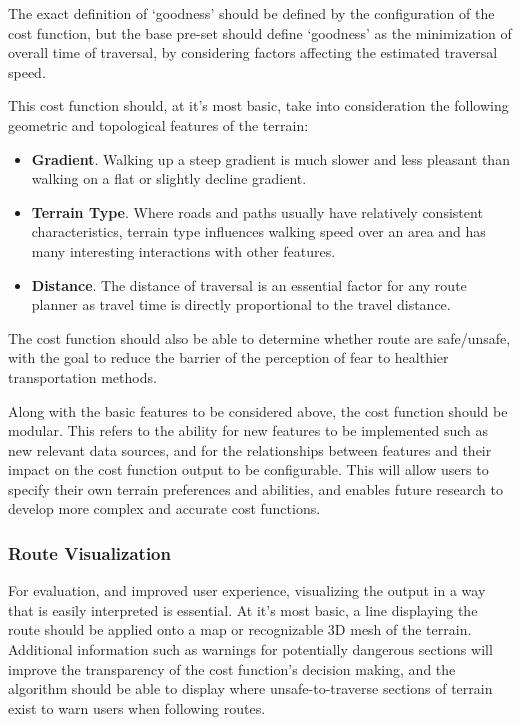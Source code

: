 \documentclass[12pt]{article}
\begin{document}
The exact definition of `goodness' should be defined by the configuration of the cost function, but the base pre-set should define `goodness' as the minimization of overall time of traversal, by considering factors affecting the estimated traversal speed.

This cost function should, at it's most basic, take into consideration the following geometric and topological features of the terrain:

\begin{itemize}
  \item \textbf{Gradient}. Walking up a steep gradient is much slower and less pleasant than walking on a flat or slightly decline gradient.
  \item \textbf{Terrain Type}. Where roads and paths usually have relatively consistent characteristics, terrain type influences walking speed over an area and has many interesting interactions with other features.
  \item \textbf{Distance}. The distance of traversal is an essential factor for any route planner as travel time is directly proportional to the travel distance.
\end{itemize}

The cost function should also be able to determine whether route are safe/unsafe, with the goal to reduce the barrier of the perception of fear to healthier transportation methods.

Along with the basic features to be considered above, the cost function should be modular. This refers to the ability for new features to be implemented such as new relevant data sources, and for the relationships between features and their impact on the cost function output to be configurable. This will allow users to specify their own terrain preferences and abilities, and enables future research to develop more complex and accurate cost functions.

\subsubsection{Route Visualization}

For evaluation, and improved user experience, visualizing the output in a way that is easily interpreted is essential. At it's most basic, a line displaying the route should be applied onto a map or recognizable 3D mesh of the terrain. Additional information such as warnings for potentially dangerous sections will improve the transparency of the cost function's decision making, and the algorithm should be able to display where unsafe-to-traverse sections of terrain exist to warn users when following routes.
\end{document}
